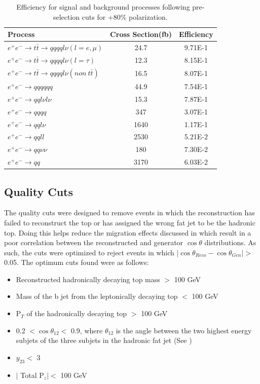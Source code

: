 \begin{table}
  \centering
  \begin{tabular}{l | c | c }
    \toprule
    Process     & Cross Section(fb) & Efficiency \\
    \midrule
     $e^+e^-\rightarrow t\bar{t} \rightarrow qqqql\nu (l=e,\mu)$& 24.7 & 9.71E-1\\
    \midrule
    $e^+e^-\rightarrow t\bar{t} \rightarrow qqqql\nu (l=\tau)$& 12.3 & 8.15E-1\\
    \midrule
    $e^+e^-\rightarrow t\bar{t} \rightarrow qqqql\nu (non ~ t\bar{t})$& 16.5 & 8.07E-1\\
    \midrule
    $e^+e^-\rightarrow qqqqqq$ & 44.9 &  7.54E-1\\
    \midrule
    $e^+e^-\rightarrow qql\nu l\nu$ & 15.3  & 7.87E-1\\
    \midrule
    $e^+e^-\rightarrow qqqq$ & 347 &  3.07E-1\\
    \midrule
    $e^+e^-\rightarrow qql\nu$ & 1640 &  1.17E-1\\
    \midrule
    $e^+e^-\rightarrow qqll$ & 2530 &  5.21E-2\\
    \midrule
    $e^+e^-\rightarrow qq\nu\nu$ & 180 & 7.30E-2 \\
    \midrule
    $e^+e^-\rightarrow qq$ & 3170 & 6.03E-2 \\
    \bottomrule
  \end{tabular}
  \caption{Efficiency for signal and background processes following pre-selection cuts for +80\% polarization.}
  \label{table:toppreselpos}
\end{table}

\subsection{Quality Cuts}
\label{Quality Cuts}

The quality cuts were designed to remove events in which the reconstruction has failed to reconstruct the top or has assigned the wrong fat jet to be the hadronic top. Doing this helps reduce the migration effects discussed in  which result in a poor correlation between the reconstructed and generator $\cos\theta$ distributions. As such, the cuts were optimized to reject events in which $|\cos\theta_{Reco}-\cos\theta_{Gen}| > $ 0.05. The optimum cuts found were as follows:

\begin{itemize}
\item Reconstructed hadronically decaying top mass $>$ 100 GeV
\item Mass of the b jet from the leptonically decaying top $<$ 100 GeV
\item P$_T$ of the hadronically decaying top $>$ 100 GeV
\item 0.2 $< \cos\theta_{12} <$ 0.9, where $\theta_{12}$ is the angle between the two highest energy subjets of the three subjets in the hadronic fat jet (See )
\item $y_{23} <$ 3
\item $\mid$ Total P$_z \mid <$ 100 GeV
\end{itemize}

